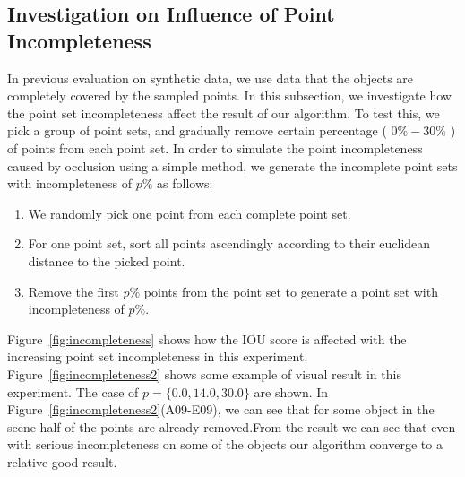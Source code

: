 \subsection{Investigation on Influence of Point Incompleteness}
\label{sec:exp-incompleteness}
In previous evaluation on synthetic data, we use data that the objects are completely covered by the sampled points. 
%
In this subsection, we investigate how the point set incompleteness affect the result of our algorithm. 
%
To test this, we pick a group of point sets, and gradually remove certain percentage ( $0\%-30\%$ ) of points from each point set. In order to simulate the point incompleteness caused by occlusion using a simple method, we generate the incomplete point sets with incompleteness of $p\%$ as follows:
\begin{enumerate}
	\item We randomly pick one point from each complete point set. 
	\item For one point set, sort all points ascendingly according to their euclidean distance to the picked point.  
	\item Remove the first $p\%$ points from the point set to generate a point set with incompleteness of $p\%$.
\end{enumerate}
% 
Figure~\ref{fig:incompleteness} shows how the IOU score is affected with the increasing point set incompleteness in this experiment. 
Figure~\ref{fig:incompleteness2} shows some example of visual result in this experiment. The case of $p=\{0.0,14.0,30.0\}$ are shown. In Figure~\ref{fig:incompleteness2}(A09-E09), we can see that for some object in the scene half of the points are already removed.From the result we can see that even with serious incompleteness on some of the objects our algorithm converge to a relative good result.

